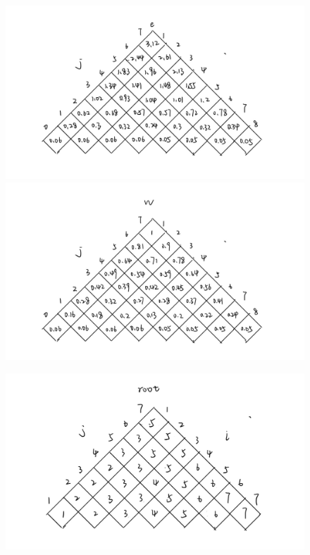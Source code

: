 \documentclass[]{report}
\begin{document}
	\begin{figure}
		\centering
		\begin{minipage}{20em}
			\centering
			\includegraphics[scale = 0.13]{images/3_2.png}
		\end{minipage}
		\begin{minipage}{20em}
			\centering
			\includegraphics[scale = 0.13]{images/3_3.png}
		\end{minipage}
	\end{figure}
	\begin{figure}
		\centering
		\begin{minipage}{40em}
			\centering
			\includegraphics[scale = 0.2]{images/3_4.png}
		\end{minipage}
	\end{figure}
\end{document}
